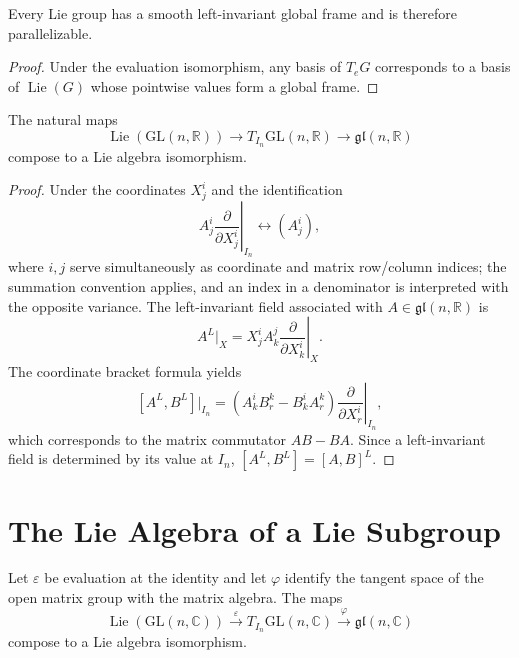 \begin{corollary}
\label{cor:8-39}




Every Lie group has a smooth left-invariant global frame and is therefore
parallelizable.
\end{corollary}

\begin{proof}

\sketch Under the evaluation isomorphism, any basis of $T_eG$ corresponds to
a basis of $\operatorname{Lie}(G)$ whose pointwise values form a global frame.
\end{proof}

\begin{proposition}
\label{prop:8-41}




The natural maps
\[
\operatorname{Lie}(\mathrm{GL}(n,\mathbb{R}))
\longrightarrow T_{I_n}\mathrm{GL}(n,\mathbb{R})
\longrightarrow\mathfrak{gl}(n,\mathbb{R}) \tag{8.14}
\]
compose to a Lie algebra isomorphism.
\end{proposition}

\begin{proof}

\sketch Under the coordinates $X_j^i$ and the identification
\[
\left.A_j^i\frac{\partial}{\partial X_j^i}\right|_{I_n}
\longleftrightarrow (A_j^i),
\]
where $i,j$ serve simultaneously as coordinate and matrix row/column indices;
the summation convention applies, and an index in a denominator is interpreted
with the opposite variance.
The left-invariant field associated with $A\in\mathfrak{gl}(n,\mathbb{R})$ is
\[
A^L|_X=\left.X_j^iA_k^j\frac{\partial}{\partial X_k^i}\right|_X. \tag{8.15}
\]
The coordinate bracket formula yields
\[
[A^L,B^L]|_{I_n}
=\left(A_k^iB_r^k-B_k^iA_r^k\right)
 \left.\frac{\partial}{\partial X_r^i}\right|_{I_n},
\]
which corresponds to the matrix commutator $AB-BA$. Since a left-invariant
field is determined by its value at $I_n$, $[A^L,B^L]=[A,B]^L$.
\end{proof}

\section{The Lie Algebra of a Lie Subgroup}

\begin{proposition}
\label{prop:8-48}





Let $\varepsilon$ be evaluation at the identity and let $\varphi$ identify the
tangent space of the open matrix group with the matrix algebra. The maps
\[
\operatorname{Lie}(\mathrm{GL}(n,\mathbb{C}))
\xrightarrow{\ \varepsilon\ }
T_{I_n}\mathrm{GL}(n,\mathbb{C})
\xrightarrow{\ \varphi\ }
\mathfrak{gl}(n,\mathbb{C}) \tag{8.18}
\]
compose to a Lie algebra isomorphism.
\end{proposition}

